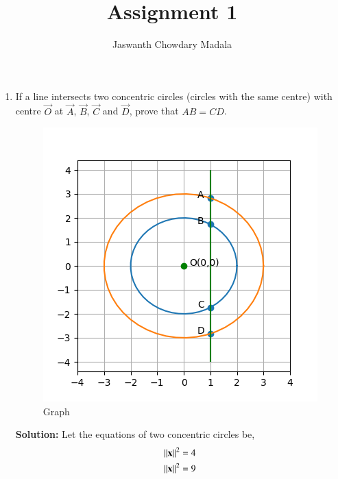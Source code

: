 \documentclass[journal,12pt,twocolumn]{IEEEtran}
\begin{document}
\vspace{3cm}


\title{Assignment 1}
\author{Jaswanth Chowdary Madala}





\maketitle

\newpage


\bigskip

\renewcommand{\thefigure}{\theenumi}
\renewcommand{\thetable}{\theenumi}


\begin{enumerate}
\item If a line intersects two concentric circles (circles
with the same centre) with centre $\vec{O}$ at $\vec{A}$, $\vec{B}$, $\vec{C}$ and $\vec{D}$, prove that $AB = CD$.
\begin{figure}[ht]
\centering
\includegraphics[width = \columnwidth]{figs/fig.png}
\caption{Graph}
\label{fig:1}
\end{figure}

\textbf{Solution:}
Let the equations of two concentric circles be,
\begin{align}
\left\lVert\mathbf{x}\right\rVert^2 &= 4
\label{eq:1}\\
\left\lVert\mathbf{x}\right\rVert^2 &= 9
\label{eq:2}
\end{align}


\end{enumerate}
\end{document}
